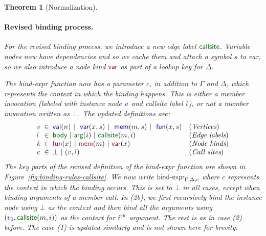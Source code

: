 \documentclass[acmsmall,anonymous,fleqn]{acmart}\settopmatter{printfolios=false,printccs=false,printacmref=false}
\newcounter{thc}
\theoremstyle{plain}
\newtheorem{theorem}[thc]{Theorem}
\theoremstyle{definition}
\newcommand{\ident}[1]{\textnormal{\textcolor{idclr}{\sffamily #1}}}
\newcommand{\bndclr}[1]{\textcolor{kvdclr}{#1}}
\newcommand{\bkndclr}[1]{\textcolor{prepclr}{#1}}
\newcommand{\blblclr}[1]{\textcolor{numclr}{#1}}
\newcommand{\bnd}[1]{\textnormal{\textcolor{kvdclr}{\sffamily #1}}}
\newcommand{\bknd}[1]{\textnormal{\textcolor{prepclr}{\sffamily #1}}}
\newcommand{\blbl}[1]{\textnormal{\textcolor{numclr}{\sffamily #1}}}
\begin{document}
\begin{theorem}[Normalization]

\paragraph{Revised binding process.}
For the revised binding process, we introduce a new edge label $\blbl{callsite}$. Variable nodes
now have dependencies and so we cache them and attach a symbol $s$ to \bnd{var}, so we also
introduce a node kind $\bknd{var}$ as part of a lookup key for $\Delta$.

The \ident{bind-expr} function now has a parameter $c$, in addition to $\Gamma$ and $\Delta$, which
represents the context in which the binding happens. This is either a member invocation (labeled
with instance node $\bndclr{v}$ and \blbl{callsite} label $\blblclr{l}$), or not a member
invocation written as $\bot$. The updated definitions are:
%
\begin{equation*}
\begin{array}{lcll}
\bndclr{v} &\hspace{-0.5em}\in\hspace{-0.5em}&\bnd{val}(n)~|~\bnd{var}(x, s)~|~\bnd{mem}(m, s)~|~\bnd{fun}(x, s)&(\textit{Vertices})\\
\blblclr{l}&\hspace{-0.5em}\in\hspace{-0.5em}&\blbl{body}~|~\blbl{arg}(i)~|~\blbl{callsite}(m,i)&(\textit{Edge labels})\\
\bkndclr{k}&\hspace{-0.5em}\in\hspace{-0.5em}&\bknd{fun}(x)~|~\bknd{mem}(m)~|~\bknd{var}(x)&(\textit{Node kinds})\\
          c&\hspace{-0.5em}\in\hspace{-0.5em}&\bot ~|~(\bndclr{v}, \blblclr{l})&(\textit{Call sites})\\
\end{array}
\end{equation*}
%
The key parts of the revised definition of the \ident{bind-expr} function are shown in Figure~\ref{fig:binding-rules-callsite}.
We now write $\ident{bind-expr}_{\Gamma,\Delta,c}$ where $c$ represents the context in which the
binding occurs. This is set to $\bot$ in all cases, except when binding arguments of a member call.
In (2b), we first recursively bind the instance node using $\bot$ as the context and then
bind all the arguments using $(\bndclr{v_0}, \blbl{callsite}(m, i))$ as the context for $i^{\textnormal{th}}$
argument. The rest is as in case (2) before. The case (1) is updated similarly and is not shown
here for brevity.


\end{theorem}
\end{document}
